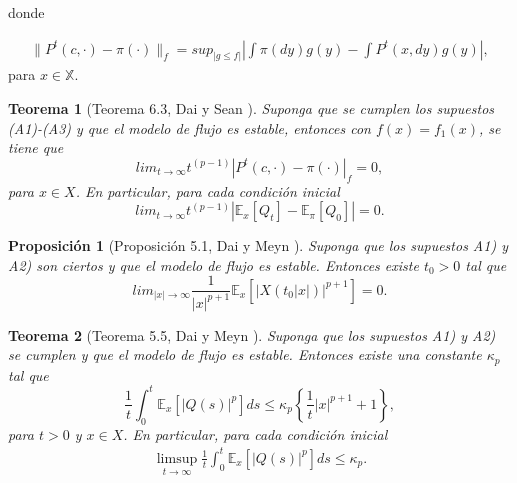 \documentclass{article}
\newtheorem{Teo}{Teorema}[section]
\newtheorem{Prop}{Proposición}[section]
\newcommand{\esp}{\mathbb{E}}
\numberwithin{equation}{section}
\begin{document}
donde

\begin{eqnarray*}
\parallel
P^{t}\left(c,\cdot\right)-\pi\left(\cdot\right)\parallel_{f}=sup_{|g\leq
f|}|\int\pi\left(dy\right)g\left(y\right)-\int
P^{t}\left(x,dy\right)g\left(y\right)|,
\end{eqnarray*}
para $x\in\mathbb{X}$.

\begin{Teo}[Teorema 6.3, Dai y Sean \cite{DaiSean}]\label{Tma.6.3}
Suponga que se cumplen los supuestos (A1)-(A3) y que el modelo de
flujo es estable, entonces con
$f\left(x\right)=f_{1}\left(x\right)$, se tiene que
\[lim_{t\rightarrow\infty}t^{(p-1)}\left|P^{t}\left(c,\cdot\right)-\pi\left(\cdot\right)\right|_{f}=0,\]
para $x\in X$. En particular, para cada condici\'on inicial
\[lim_{t\rightarrow\infty}t^{(p-1)}\left|\esp_{x}\left[Q_{t}\right]-\esp_{\pi}\left[Q_{0}\right]\right|=0.\]
\end{Teo}



\begin{Prop}[Proposici\'on 5.1, Dai y Meyn \cite{DaiSean}]\label{Prop.5.1.DaiSean}
Suponga que los supuestos A1) y A2) son ciertos y que el modelo de
flujo es estable. Entonces existe $t_{0}>0$ tal que
\begin{equation}
lim_{|x|\rightarrow\infty}\frac{1}{|x|^{p+1}}\esp_{x}\left[|X\left(t_{0}|x|\right)|^{p+1}\right]=0.
\end{equation}
\end{Prop}


\begin{Teo}[Teorema 5.5, Dai y Meyn \cite{DaiSean}]\label{Tma.5.5.DaiSean}
Suponga que los supuestos A1) y A2) se cumplen y que el modelo de
flujo es estable. Entonces existe una constante $\kappa_{p}$ tal
que
\begin{equation}
\frac{1}{t}\int_{0}^{t}\esp_{x}\left[|Q\left(s\right)|^{p}\right]ds\leq\kappa_{p}\left\{\frac{1}{t}|x|^{p+1}+1\right\},
\end{equation}
para $t>0$ y $x\in X$. En particular, para cada condici\'on
inicial
\begin{eqnarray*}
\limsup_{t\rightarrow\infty}\frac{1}{t}\int_{0}^{t}\esp_{x}\left[|Q\left(s\right)|^{p}\right]ds\leq\kappa_{p}.
\end{eqnarray*}
\end{Teo}
\end{document}
